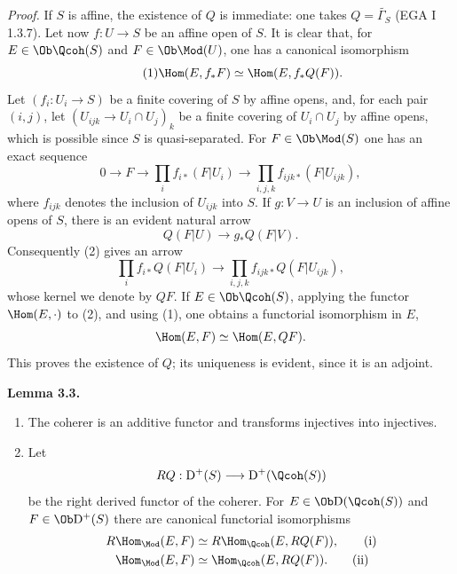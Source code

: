 \emph{Proof.} If $S$ is affine, the existence of $Q$ is immediate: one takes $Q=\widetilde{\Gamma_S}$ (EGA I 1.3.7). Let now $f:U\to S$ be an affine open of $S$. It is clear that, for $E\in\Ob\Qcoh(S)$ and $F\in\Ob\Mod(U)$, one has a canonical isomorphism
\begin{equation}\tag{1}
 \Hom(E,f_*F)\simeq \Hom(E,f_*Q(F)).
\end{equation}
Let $(f_i:U_i\to S)$ be a finite covering of $S$ by affine opens, and, for each pair $(i,j)$, let $(U_{ijk}\to U_i\cap U_j)_k$ be a finite covering of $U_i\cap U_j$ by affine opens, which is possible since $S$ is quasi-separated. For $F\in\Ob\Mod(S)$ one has an exact sequence
\begin{equation}\tag{2}
 0\longrightarrow F\longrightarrow \prod_i f_{i*}(F|U_i)
 \longrightarrow \prod_{i,j,k}f_{ijk*}(F|U_{ijk}),
\end{equation}
where $f_{ijk}$ denotes the inclusion of $U_{ijk}$ into $S$. If $g:V\to U$ is an inclusion of affine opens of $S$, there is an evident natural arrow
\[
 Q(F|U)\longrightarrow g_*Q(F|V).
\]
Consequently (2) gives an arrow
\begin{equation}\tag{3}
 \prod_i f_{i*}Q(F|U_i)\longrightarrow
 \prod_{i,j,k}f_{ijk*}Q(F|U_{ijk}),
\end{equation}
whose kernel we denote by $QF$. If $E\in\Ob\Qcoh(S)$, applying the functor $\Hom(E,\cdot)$ to (2), and using (1), one obtains a functorial isomorphism in $E$,
\[
 \Hom(E,F)\simeq\Hom(E,QF).
\]
This proves the existence of $Q$; its uniqueness is evident, since it is an adjoint.

\textbf{Lemma 3.3.} \begin{enumerate}[label=\alph*)]
\item The coherer is an additive functor and transforms injectives into injectives.
\item Let
\[
 RQ:\mathrm D^+(S)\longrightarrow \mathrm D^+(\Qcoh(S))
\]
be the right derived functor of the coherer. For $E\in\Ob\mathrm D(\Qcoh(S))$ and $F\in\Ob\mathrm D^+(S)$ there are canonical functorial isomorphisms
\begin{align}
 R\Hom_{\Mod}(E,F)&\simeq R\Hom_{\Qcoh}(E,RQ(F)), \tag{i}\\
 \Hom_{\Mod}(E,F)&\simeq \Hom_{\Qcoh}(E,RQ(F)). \tag{ii}
\end{align}
\end{enumerate}

